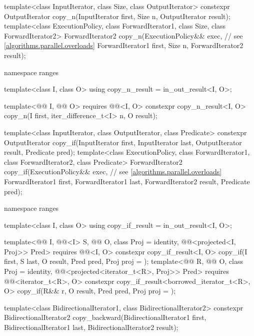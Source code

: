 \begin{codeblock}
{  template<class InputIterator, class Size, class OutputIterator>
    constexpr OutputIterator copy_n(InputIterator first, Size n,
                                    OutputIterator result);
  template<class ExecutionPolicy, class ForwardIterator1, class Size,
           class ForwardIterator2>
    ForwardIterator2 copy_n(ExecutionPolicy&& exec,             // see \ref{algorithms.parallel.overloads}
                            ForwardIterator1 first, Size n,
                            ForwardIterator2 result);

  namespace ranges {
    template<class I, class O>
      using copy_n_result = in_out_result<I, O>;

    template<@@ I, @@ O>
      requires @@<I, O>
      constexpr copy_n_result<I, O>
        copy_n(I first, iter_difference_t<I> n, O result);
  }

  template<class InputIterator, class OutputIterator, class Predicate>
    constexpr OutputIterator copy_if(InputIterator first, InputIterator last,
                                     OutputIterator result, Predicate pred);
  template<class ExecutionPolicy, class ForwardIterator1, class ForwardIterator2,
           class Predicate>
    ForwardIterator2 copy_if(ExecutionPolicy&& exec,            // see \ref{algorithms.parallel.overloads}
                             ForwardIterator1 first, ForwardIterator1 last,
                             ForwardIterator2 result, Predicate pred);

  namespace ranges {
    template<class I, class O>
      using copy_if_result = in_out_result<I, O>;

    template<@@ I, @@<I> S, @@ O, class Proj = identity,
             @@<projected<I, Proj>> Pred>
      requires @@<I, O>
      constexpr copy_if_result<I, O>
        copy_if(I first, S last, O result, Pred pred, Proj proj = {});
    template<@@ R, @@ O, class Proj = identity,
             @@<projected<iterator_t<R>, Proj>> Pred>
      requires @@<iterator_t<R>, O>
      constexpr copy_if_result<borrowed_iterator_t<R>, O>
        copy_if(R&& r, O result, Pred pred, Proj proj = {});
  }

  template<class BidirectionalIterator1, class BidirectionalIterator2>
    constexpr BidirectionalIterator2
      copy_backward(BidirectionalIterator1 first, BidirectionalIterator1 last,
                    BidirectionalIterator2 result);

}
\end{codeblock}

